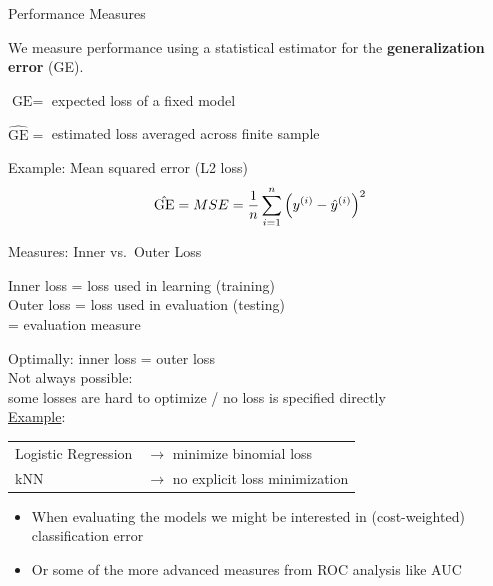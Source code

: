     \begin{frame}[c]{Performance Measures}

    We measure performance using a statistical estimator for the 
    \textbf{generalization error} (GE).

    $\text{GE} = $ expected loss of a fixed model

    $\hat{\text{GE}} = $ estimated loss averaged across finite sample

    Example: Mean squared error (L2 loss)
    \[
        \hat{\text{GE}} = MSE = \frac{1}{n} \sum_{i=1}^n \left(y^{(i)} - \hat{y}^{(i)}\right)^2
    \]

    \end{frame}

    \begin{frame}[c]{Measures: Inner vs.\ Outer Loss}

    \begin{center}
        Inner loss = loss used in learning (training)\\
        Outer loss = loss used in evaluation (testing)\\
            = evaluation measure
    \end{center}

    Optimally: inner loss = outer loss\\[.5em]
    Not always possible:\\ some losses are hard to optimize / no loss is specified directly\\

    \underline{Example}:\\[.5em]
    \begin{tabular}{ll}
    Logistic Regression & $\rightarrow$ minimize binomial loss \\
    kNN & $\rightarrow$ no explicit loss minimization\\
    \end{tabular}
    \begin{itemize}
      \item When evaluating the models we might be interested in (cost-weighted) classification error 
      \item Or some of the more advanced measures from ROC analysis like AUC
    \end{itemize}

    \end{frame}

